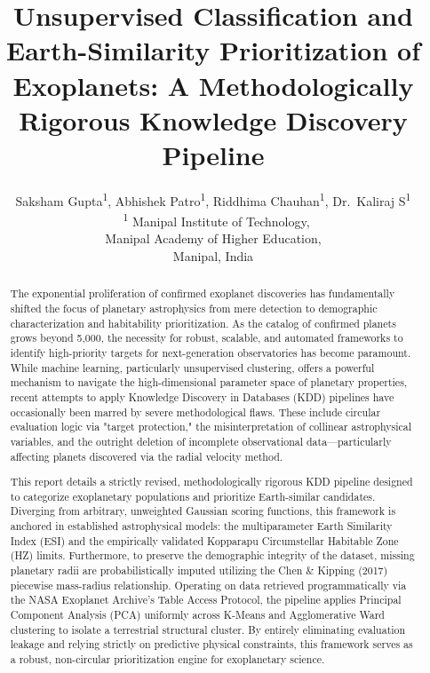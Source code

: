 \documentclass[conference]{IEEEtran}
\begin{document}
\title{Unsupervised Classification and Earth-Similarity Prioritization of Exoplanets: A Methodologically Rigorous Knowledge Discovery Pipeline}

\author{
Saksham Gupta\textsuperscript{1}, 
Abhishek Patro\textsuperscript{1}, 
Riddhima Chauhan\textsuperscript{1}, 
Dr.\ Kaliraj S\textsuperscript{1} \\
\
\textsuperscript{1}
Manipal Institute of Technology, \\
Manipal Academy of Higher Education, \\
Manipal, India
}

\maketitle

\begin{abstract}
The exponential proliferation of confirmed exoplanet discoveries has fundamentally shifted the focus of planetary astrophysics from mere detection to demographic characterization and habitability prioritization. As the catalog of confirmed planets grows beyond 5,000, the necessity for robust, scalable, and automated frameworks to identify high-priority targets for next-generation observatories has become paramount. While machine learning, particularly unsupervised clustering, offers a powerful mechanism to navigate the high-dimensional parameter space of planetary properties, recent attempts to apply Knowledge Discovery in Databases (KDD) pipelines have occasionally been marred by severe methodological flaws. These include circular evaluation logic via "target protection," the misinterpretation of collinear astrophysical variables, and the outright deletion of incomplete observational data---particularly affecting planets discovered via the radial velocity method.

This report details a strictly revised, methodologically rigorous KDD pipeline designed to categorize exoplanetary populations and prioritize Earth-similar candidates. Diverging from arbitrary, unweighted Gaussian scoring functions, this framework is anchored in established astrophysical models: the multiparameter Earth Similarity Index (ESI) and the empirically validated Kopparapu Circumstellar Habitable Zone (HZ) limits. Furthermore, to preserve the demographic integrity of the dataset, missing planetary radii are probabilistically imputed utilizing the Chen \& Kipping (2017) piecewise mass-radius relationship. Operating on data retrieved programmatically via the NASA Exoplanet Archive's Table Access Protocol, the pipeline applies Principal Component Analysis (PCA) uniformly across K-Means and Agglomerative Ward clustering to isolate a terrestrial structural cluster. By entirely eliminating evaluation leakage and relying strictly on predictive physical constraints, this framework serves as a robust, non-circular prioritization engine for exoplanetary science.
\end{abstract}
\end{document}
